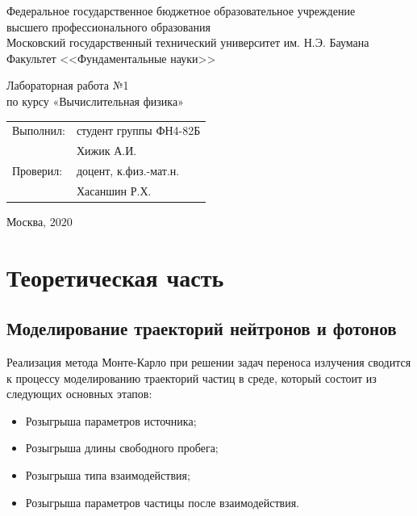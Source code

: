 \documentclass[
11pt,
master, %
subf, %
href, %
colorlinks=true, %
]{disser}
\begin{document}
\pagestyle{empty}
\begin{center}
	
	\noindent  Федеральное государственное бюджетное образовательное учреждение\\
	высшего профессионального образования\\
	
	Московский государственный технический университет им. Н.Э. Баумана \\
	Факультет <<Фундаментальные науки>>\bigskip\\
	
	\vfill
	
	Лабораторная работа №1\\
	по курсу «Вычислительная физика»\\
	
	
	\vfill
	\vfill
	\begin{flushright}
		\begin{tabular}{ll}
			Выполнил: & студент группы ФН4-82Б     \\
			& Хижик А.И. \\
			Проверил:  & доцент, к.физ.-мат.н.       \\
			& Хасаншин Р.Х.
		\end{tabular}
	\end{flushright}
	\vfill
	\begin{center}
		Москва, $2020$
	\end{center}
	
\end{center}
\pagebreak


\pagestyle{plain}
\tableofcontents

\section{Теоретическая часть}
\subsection{Моделирование траекторий нейтронов и фотонов}

Реализация метода Монте-Карло при решении задач переноса излучения сводится к процессу моделированию траекторий частиц в среде, который состоит из следующих основных этапов:

\begin{itemize}
\item Розыгрыша параметров источника;
\item Розыгрыша длины свободного пробега;
\item Розыгрыша типа взаимодействия;
\item Розыгрыша параметров частицы после взаимодействия.
\end{itemize}
\end{document}
